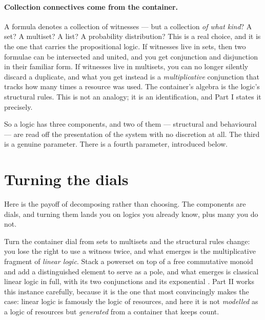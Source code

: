 \paragraph{Collection connectives come from the container.}
A formula denotes a collection of witnesses --- but a collection \emph{of what
kind}? A set? A multiset? A list? A probability distribution? This is a real
choice, and it is the one that carries the propositional logic. If witnesses live
in sets, then two formulae can be intersected and united, and you get conjunction
and disjunction in their familiar form. If witnesses live in multisets, you can no
longer silently discard a duplicate, and what you get instead is a
\emph{multiplicative} conjunction that tracks how many times a resource was used.
The container's algebra is the logic's structural rules. This is not an analogy;
it is an identification, and Part I states it precisely.

\bigskip
\noindent
So a logic has three components, and two of them --- structural and behavioural
--- are read off the presentation of the system with no discretion at all. The
third is a genuine parameter. There is a fourth parameter, introduced below.

\section{Turning the dials}
\label{sec:0dials}

Here is the payoff of decomposing rather than choosing. The components are dials,
and turning them lands you on logics you already know, plus many you do not.

Turn the container dial from sets to multisets and the structural rules change:
you lose the right to use a witness twice, and what emerges is the multiplicative
fragment of \emph{linear logic}. Stack a powerset on top of a free commutative
monoid and add a distinguished element to serve as a pole, and what emerges is
classical linear logic in full, with its two conjunctions and its exponential
\cite{Girard87,Yetter90}. Part II works this instance carefully, because it is
the one that most convincingly makes the case: linear logic is famously the logic
of resources, and here it is not \emph{modelled} as a logic of resources but
\emph{generated} from a container that keeps count.


